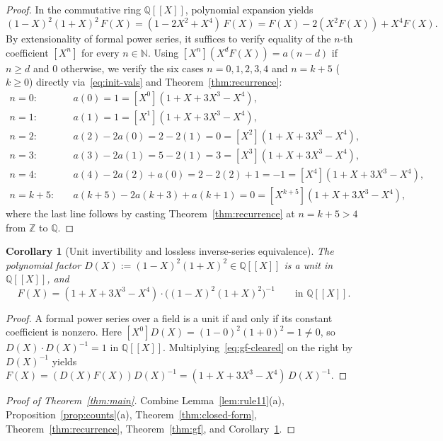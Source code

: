 \documentclass[11pt]{article}
\newcommand{\llbracket}{[\![}
\newcommand{\rrbracket}{]\!]}
\newtheorem{corollary}[theorem]{Corollary}
\theoremstyle{definition}
\newcommand{\N}{\mathbb{N}}
\newcommand{\Z}{\mathbb{Z}}
\newcommand{\Q}{\mathbb{Q}}
\begin{document}
\begin{proof}
In the commutative ring $\Q\llbracket X \rrbracket$, polynomial expansion yields
\[
(1 - X)^2 (1 + X)^2 \, F(X) = (1 - 2X^2 + X^4)\,F(X) = F(X) - 2(X^2 F(X)) + X^4 F(X).
\]
By extensionality of formal power series, it suffices to verify equality of the $n$-th coefficient $[X^n]$ for every $n \in \N$. Using $[X^n](X^d F(X)) = a(n - d)$ if $n \ge d$ and $0$ otherwise, we verify the six cases $n = 0, 1, 2, 3, 4$ and $n = k + 5$ ($k \ge 0$) directly via~\eqref{eq:init-vals} and Theorem~\ref{thm:recurrence}:
\begin{align*}
n = 0:\quad & a(0) = 1 = [X^0](1 + X + 3X^3 - X^4), \\
n = 1:\quad & a(1) = 1 = [X^1](1 + X + 3X^3 - X^4), \\
n = 2:\quad & a(2) - 2a(0) = 2 - 2(1) = 0 = [X^2](1 + X + 3X^3 - X^4), \\
n = 3:\quad & a(3) - 2a(1) = 5 - 2(1) = 3 = [X^3](1 + X + 3X^3 - X^4), \\
n = 4:\quad & a(4) - 2a(2) + a(0) = 2 - 2(2) + 1 = -1 = [X^4](1 + X + 3X^3 - X^4), \\
n = k + 5:\quad & a(k + 5) - 2a(k + 3) + a(k + 1) = 0 = [X^{k+5}](1 + X + 3X^3 - X^4),
\end{align*}
where the last line follows by casting Theorem~\ref{thm:recurrence} at $n = k + 5 > 4$ from $\Z$ to $\Q$.
\end{proof}

\begin{corollary}[Unit invertibility and lossless inverse-series equivalence]
\label{cor:unit-inv}
The polynomial factor $D(X) := (1 - X)^2(1 + X)^2 \in \Q\llbracket X \rrbracket$ is a unit in $\Q\llbracket X \rrbracket$, and
\[
F(X) = (1 + X + 3X^3 - X^4) \cdot \bigl((1 - X)^2(1 + X)^2\bigr)^{-1} \qquad \text{in }\Q\llbracket X \rrbracket.
\]
\end{corollary}

\begin{proof}
A formal power series over a field is a unit if and only if its constant coefficient is nonzero. Here $[X^0]D(X) = (1 - 0)^2(1 + 0)^2 = 1 \ne 0$, so $D(X) \cdot D(X)^{-1} = 1$ in $\Q\llbracket X \rrbracket$. Multiplying~\eqref{eq:gf-cleared} on the right by $D(X)^{-1}$ yields $F(X) = (D(X) F(X)) D(X)^{-1} = (1 + X + 3X^3 - X^4)\,D(X)^{-1}$.
\end{proof}

\begin{proof}[Proof of Theorem~\ref{thm:main}]
Combine Lemma~\ref{lem:rule11}(a), Proposition~\ref{prop:counts}(a), Theorem~\ref{thm:closed-form}, Theorem~\ref{thm:recurrence}, Theorem~\ref{thm:gf}, and Corollary~\ref{cor:unit-inv}.
\end{proof}
\end{document}
